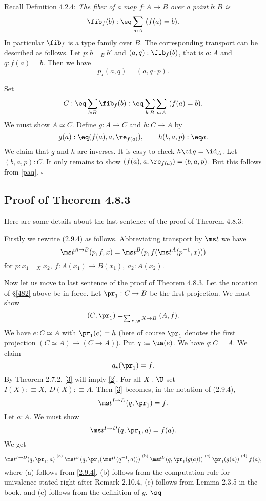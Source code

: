 \documentclass[12pt]{article}
\begin{document}
Recall Definition 4.2.4: \emph{The fiber of a map $f:A\to B$ over a point $b:B$ is} 
$$
\fib_f(b):\eq\sum_{a:A}\ (f(a)=b).
$$ 
In particular $\fib_f$ is a type family over $B$. The corresponding transport can be described as follows. Let $p:b=_Bb'$ and $(a,q):\fib_f(b)$, that is $a:A$ and $q:f(a)=b$. Then we have 
\begin{equation}\label{paq}
p_\star(a,q)=(a,q\cdot p).
\end{equation}

Set 
$$
C:\eq\sum_{b:B}\fib_f(b):\eq\sum_{b:B}\sum_{a:A}\ (f(a)=b).
$$ 
We must show $A\simeq C$. Define $g:A\to C$ and $h:C\to A$ by 
$$
g(a):\eq(f(a),a,\re_{f(a)}),\qquad h(b,a,p):\eq a.
$$ 
We claim that $g$ and $h$ are inverses. It is easy to check $h\ci g=\id_A$. Let $(b,a,p):C$. It only remains to show $(f(a),a,\re_{f(a)})=(b,a,p)$. But this follows from \eqref{paq}. $\square$


\subsection{Proof of Theorem 4.8.3}

Here are some details about the last sentence of the proof of Theorem 4.8.3:

Firstly we rewrite (2.9.4) as follows. Abbreviating transport by $\ms t$ we have 
\begin{equation}\label{2.9.4}
\ms t^{A\to B}(p,f,x)=\ms t^B(p,f(\ms t^A(p^{-1},x)))
\end{equation}
for $p:x_1=_Xx_2,\ f:A(x_1)\to B(x_1),\ a_2:A(x_2)$. 

Now let us move to last sentence of the proof of Theorem 4.8.3. Let the notation of \S\ref{482} above be in force. Let $\pr_1:C\to B$ be the first projection. We must show 
\begin{equation}\label{2}
(C,\pr_1)=_{\sum_{X:\U}X\to B}(A,f).
\end{equation} 
We have $e:C\simeq A$ with $\pr_1(e)=h$ (here of course $\pr_1$ denotes the first projection $(C\simeq A)\to(C\to A)$). Put $q:\equiv\ua(e)$. We have $q:C=A$. We claim 
\begin{equation}\label{3}
q_\star(\pr_1)=f.
\end{equation} 
By Theorem 2.7.2, \eqref{3} will imply \eqref{2}. For all $X:\U$ set $I(X):\equiv X,\ D(X):\equiv A$. Then \eqref{3} becomes, in the notation of (2.9.4), 
$$
\ms t^{I\to D}(q,\pr_1)=f.
$$ 
Let $a:A$. We must show 
$$
\ms t^{I\to D}(q,\pr_1,a)=f(a).
$$ 
We get 
$$
\ms t^{I\to D}(q,\pr_1,a)\overset{\text{(a)}}=\ms t^D(q,\pr_1(\ms t^I(q^{-1},a)))\overset{\text{(b)}}=\ms t^D(q,\pr_1(g(a)))\overset{\text{(c)}}=\pr_1(g(a))\overset{\text{(d)}}=f(a),
$$ 
where (a) follows from \eqref{2.9.4}, (b) follows from the computation rule for univalence stated right after Remark 2.10.4, (c) follows from Lemma 2.3.5 in the book, and (c) follows from the definition of $g$. $\sq$
\end{document}
